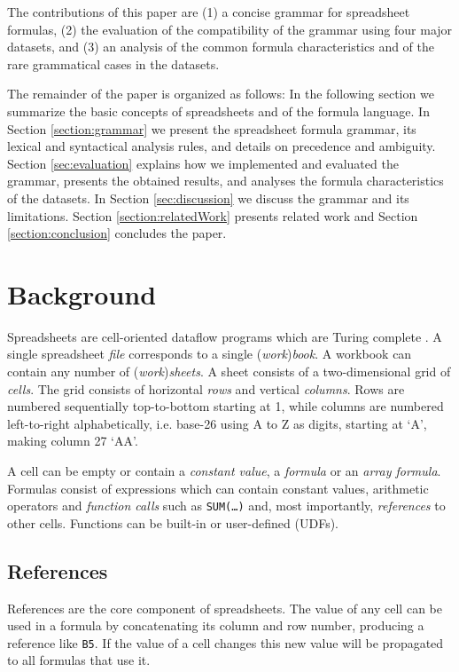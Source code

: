 \documentclass[times]{smrauth}
\begin{document}
The contributions of this paper are (1) a concise grammar for spreadsheet formulas, (2) the evaluation of the compatibility of the grammar using four major datasets, and (3) an analysis of the common formula characteristics and of the rare grammatical cases in the datasets.

The remainder of the paper is organized as follows: In the following section we summarize the basic concepts of spreadsheets and of the formula language. In Section \ref{section:grammar} we present the spreadsheet formula grammar, its lexical and syntactical analysis rules, and details on precedence and ambiguity. Section \ref{sec:evaluation} explains how we implemented and evaluated the grammar, presents the obtained results, and analyses the formula characteristics of the datasets. In Section \ref{sec:discussion} we discuss the grammar and its limitations. Section \ref{section:relatedWork} presents related work and Section \ref{section:conclusion} concludes the paper.

\section{Background}

Spreadsheets are cell-oriented dataflow programs which are Turing complete \cite{ExcelTuringComplete}.
A single spreadsheet \emph{file} corresponds to a single (\emph{work})\emph{book}.
A workbook can contain any number of (\emph{work})\emph{sheets}.
A sheet consists of a two-dimensional grid of \emph{cells}.
The grid consists of horizontal \emph{rows} and vertical \emph{columns}.
Rows are numbered sequentially top-to-bottom starting at 1, while columns are numbered left-to-right alphabetically, i.e. base-26 using A to Z as digits, starting at `A', making column 27 `AA'.

A cell can be empty or contain a \emph{constant value}, a \emph{formula} or an \emph{array formula}.
Formulas consist of expressions which can contain constant values, arithmetic operators and \emph{function calls} such as \texttt{SUM(\ldots)} and, most importantly, \emph{references} to other cells.
Functions can be built-in or user-defined (UDFs).

\subsection{References}
References are the core component of spreadsheets.
The value of any cell can be used in a formula by concatenating its column and row number, producing a reference like \texttt{B5}.
If the value of a cell changes this new value will be propagated to all formulas that use it.
\end{document}
